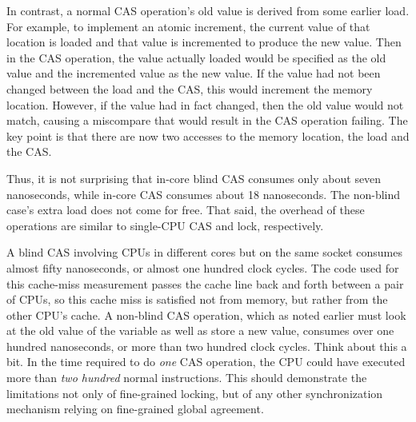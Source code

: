 \fi

In contrast, a normal CAS operation's old value is derived from
some earlier load.
For example, to implement an atomic increment, the current value of
that location is loaded and that value is incremented to produce the
new value.
Then in the CAS operation, the value actually loaded would be specified
as the old value and the incremented value as the new value.
If the value had not been changed between the load and the CAS, this
would increment the memory location.
However, if the value had in fact changed, then the old value would
not match, causing a miscompare that would result in the CAS operation
failing.
The key point is that there are now two accesses to the memory location,
the load and the CAS\@.

Thus, it is not surprising that in-core blind CAS consumes only about
seven nanoseconds, while in-core CAS consumes about 18 nanoseconds.
The non-blind case's extra load does not come for free.
That said, the overhead of these operations are similar to single-CPU
CAS and lock, respectively.

\QuickQuizEnd

A blind CAS involving CPUs in different cores but on the same socket
consumes almost fifty nanoseconds, or almost one hundred clock cycles.
The code used for this cache-miss measurement passes the cache line
back and forth between a pair of CPUs, so this cache miss is satisfied
not from memory, but rather from the other CPU's cache.
A non-blind CAS operation, which as noted earlier must look at the old
value of the variable as well as store a new value, consumes over one
hundred nanoseconds, or more than two hundred clock cycles.
Think about this a bit.
In the time required to do \emph{one} CAS operation, the CPU could have
executed more than \emph{two hundred} normal instructions.
This should demonstrate the limitations not only of fine-grained locking,
but of any other synchronization mechanism relying on fine-grained
global agreement.


